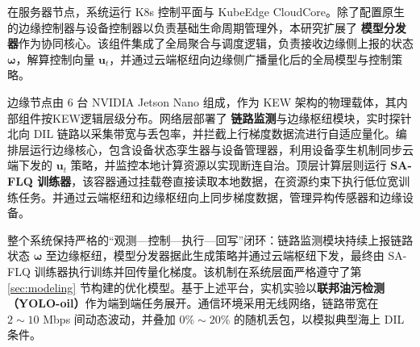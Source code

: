 在服务器节点，系统运行 K8s 控制平面与 KubeEdge CloudCore。除了配置原生的边缘控制器与设备控制器以负责基础生命周期管理外，本研究扩展了 \textbf{模型分发器}作为协同核心。该组件集成了全局聚合与调度逻辑，负责接收边缘侧上报的状态 $\boldsymbol{\omega}$，解算控制向量 $\mathbf{u}_t$，并通过云端枢纽向边缘侧广播量化后的全局模型与控制策略。

边缘节点由 6 台 NVIDIA Jetson Nano 组成，作为 KEW 架构的物理载体，其内部组件按KEW逻辑层级分布。网络层部署了 \textbf{链路监测}与边缘枢纽模块，实时探针北向 DIL 链路以采集带宽与丢包率，并拦截上行梯度数据流进行自适应量化。编排层运行边缘核心，包含设备状态孪生器与设备管理器，利用设备孪生机制同步云端下发的 $\mathbf{u}_t$ 策略，并监控本地计算资源以实现断连自治。顶层计算层则运行 \textbf{SA-FLQ 训练器}，该容器通过挂载卷直接读取本地数据，在资源约束下执行低位宽训练任务。并通过云端枢纽和边缘枢纽向上同步梯度数据，管理异构传感器和边缘设备。



整个系统保持严格的“观测—控制—执行—回写”闭环：链路监测模块持续上报链路状态 $\boldsymbol{\omega}$ 至边缘枢纽，模型分发器据此生成策略并通过云端枢纽下发，最终由 SA-FLQ 训练器执行训练并回传量化梯度。该机制在系统层面严格遵守了第 \ref{sec:modeling} 节构建的优化模型。基于上述平台，实机实验以\textbf{联邦油污检测（YOLO-oil）}作为端到端任务展开。通信环境采用无线网络，链路带宽在 $2\sim10$ Mbps 间动态波动，并叠加 $0\%\sim20\%$ 的随机丢包，以模拟典型海上 DIL 条件。

